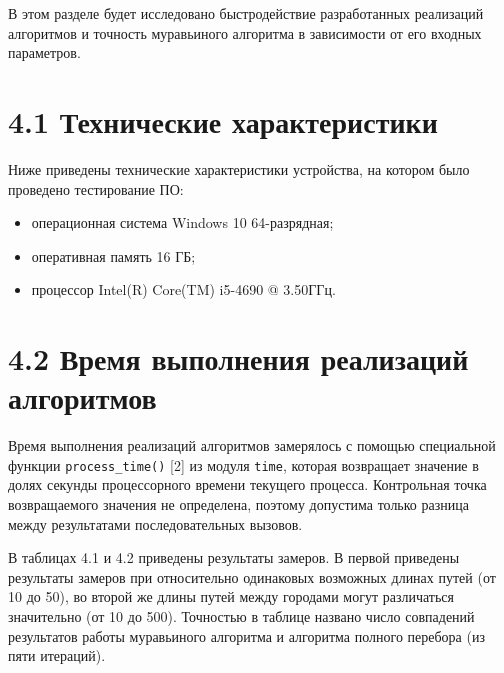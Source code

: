 \documentclass[12pt, a4paper]{report}
\begin{document}
	В этом разделе будет исследовано быстродействие разработанных реализаций алгоритмов и точность муравьиного алгоритма в зависимости от его входных параметров.
	
	\section*{4.1 Технические характеристики}
	
	Ниже приведены технические характеристики устройства, на котором было проведено тестирование ПО:
	
	\begin{itemize}
		\item операционная система Windows 10 64-разрядная;
		\item оперативная память 16 ГБ;
		\item процессор Intel(R) Core(TM) i5-4690 @ 3.50ГГц.
	\end{itemize}
	
	\section*{4.2 Время выполнения реализаций алгоритмов}
	
	Время выполнения реализаций алгоритмов замерялось с помощью специальной функции \verb|process_time()| [2] из модуля \verb|time|, которая возвращает значение в долях секунды процессорного времени текущего процесса. Контрольная точка возвращаемого значения не определена, поэтому допустима только разница между результатами последовательных вызовов.
	
	В таблицах 4.1 и 4.2 приведены результаты замеров. В первой приведены результаты замеров при относительно одинаковых возможных длинах путей (от 10 до 50), во второй же длины путей между городами могут различаться значительно (от 10 до 500). Точностью в таблице названо число совпадений результатов работы муравьиного алгоритма и алгоритма полного перебора (из пяти итераций).
	
\end{document}
